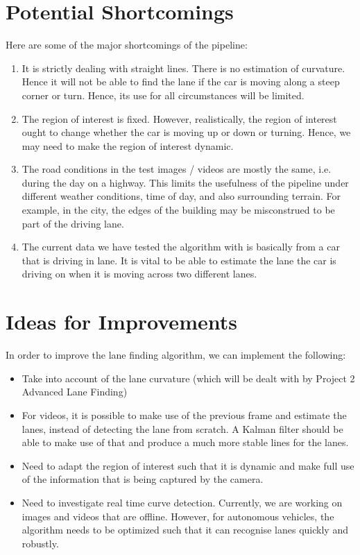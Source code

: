 \documentclass[12pt,twoside]{article}
\begin{document}
\section{Potential Shortcomings}
Here are some of the major shortcomings of the pipeline:
\begin{enumerate}
	\item It is strictly dealing with straight lines. There is no estimation of curvature. Hence it will not be able to find the lane if the car is moving along a steep corner or turn. Hence, its use for all circumstances will be limited.
	\item The region of interest is fixed. However, realistically, the region of interest ought to change whether the car is moving up or down or turning. Hence, we may need to make the region of interest dynamic.
	\item The road conditions in the test images / videos are mostly the same, i.e. during the day on a highway. This limits the usefulness of the pipeline under different weather conditions, time of day, and also surrounding terrain. For example, in the city, the edges of the building may be misconstrued to be part of the driving lane.
	\item The current data we have tested the algorithm with is basically from a car that is driving in lane. It is vital to be able to estimate the lane the car is driving on when it is moving across two different lanes.
\end{enumerate}


\section{Ideas for Improvements}
In order to improve the lane finding algorithm, we can implement the following:
\begin{itemize}
	\item Take into account of the lane curvature (which will be dealt with by Project 2 Advanced Lane Finding)
	\item For videos, it is possible to make use of the previous frame and estimate the lanes, instead of detecting the lane from scratch. A Kalman filter should be able to make use of that and produce a much more stable lines for the lanes.
	\item Need to adapt the region of interest such that it is dynamic and make full use of the information that is being captured by the camera.
	\item Need to investigate real time curve detection. Currently, we are working on images and videos that are offline. However, for autonomous vehicles, the algorithm needs to be optimized such that it can recognise lanes quickly and robustly.
\end{itemize}



%
%
\end{document}
